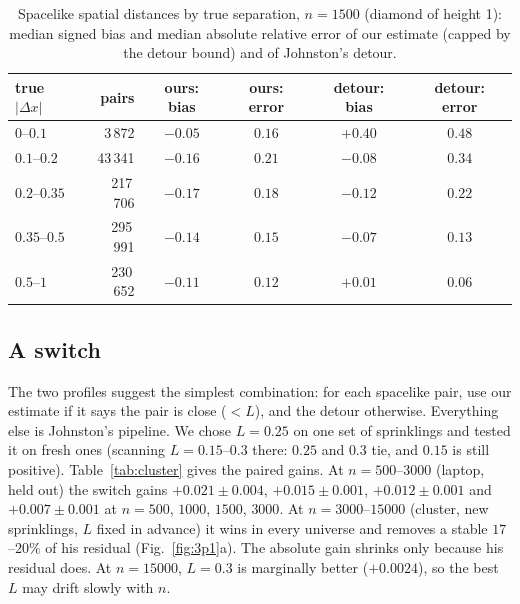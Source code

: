 \documentclass[11pt,a4paper]{article}
\begin{document}
\begin{table}[t]
\centering\small
\begin{tabular}{@{}lrcccc@{}}
\toprule
true $|\Delta x|$ & pairs & ours: bias & ours: error & detour: bias & detour: error\\
\midrule
$0$--$0.1$ & 3\,872 & $-0.05$ & $0.16$ & $+0.40$ & $0.48$\\
$0.1$--$0.2$ & 43\,341 & $-0.16$ & $0.21$ & $-0.08$ & $0.34$\\
$0.2$--$0.35$ & 217\,706 & $-0.17$ & $0.18$ & $-0.12$ & $0.22$\\
$0.35$--$0.5$ & 295\,991 & $-0.14$ & $0.15$ & $-0.07$ & $0.13$\\
$0.5$--$1$ & 230\,652 & $-0.11$ & $0.12$ & $+0.01$ & $0.06$\\
\bottomrule
\end{tabular}
\caption{Spacelike spatial distances by true separation, $n=1500$ (diamond of height 1): median signed bias and median absolute relative error of our estimate (capped by the detour bound) and of Johnston's detour.}
\label{tab:profile}
\end{table}

\subsection{A switch}\label{sec:switch}
The two profiles suggest the simplest combination: for each spacelike pair, use our estimate if it says the pair is close ($<L$), and the detour otherwise. Everything else is Johnston's pipeline. We chose $L=0.25$ on one set of sprinklings and tested it on fresh ones (scanning $L=0.15$--$0.3$ there: $0.25$ and $0.3$ tie, and $0.15$ is still positive). Table~\ref{tab:cluster} gives the paired gains. At $n=500$--$3000$ (laptop, held out) the switch gains $+0.021\pm0.004$, $+0.015\pm0.001$, $+0.012\pm0.001$ and $+0.007\pm0.001$ at $n=500$, $1000$, $1500$, $3000$. At $n=3000$--$15000$ (cluster, new sprinklings, $L$ fixed in advance) it wins in every universe and removes a stable $17$--$20\%$ of his residual (Fig.~\ref{fig:3p1}a). The absolute gain shrinks only because his residual does. At $n=15000$, $L=0.3$ is marginally better ($+0.0024$), so the best $L$ may drift slowly with $n$.
\end{document}
